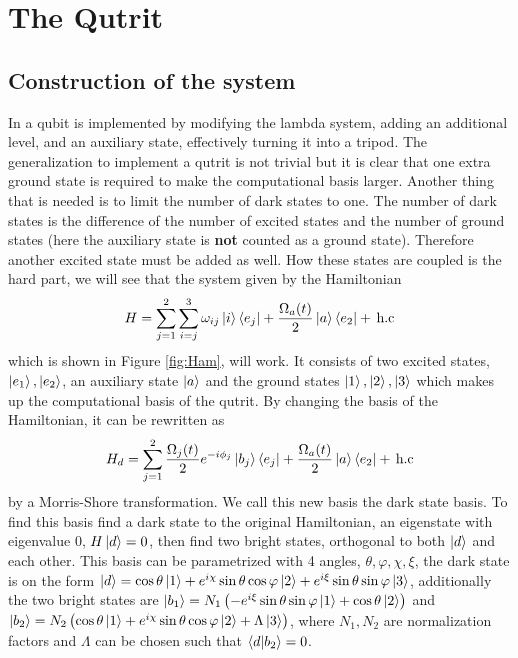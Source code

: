 \section{The Qutrit}
\subsection{Construction of the system}
In \cite{darkpath} a qubit is implemented by modifying the lambda system, adding an additional level, and an auxiliary state, effectively turning it into a tripod. 
The generalization to implement a qutrit is not trivial but it is clear that one extra ground state is required to make the computational basis larger. Another thing that is needed is to limit the number of dark states to one. The number of dark states is the difference of the number of excited states and the number of ground states\cite{lambda} (here the auxiliary state is \textbf{not} counted as a ground state). Therefore another excited state must be added as well. How these states are coupled is the hard part, we will see that the system given by the Hamiltonian
\begin{equation}
\label{eq:Ham}
H = \sum_{j = 1}^2 \sum_{i =j}^{3} \omega_{ij}\ket{i}\bra{e_j}  + \frac{\Omega_{a}(t)}{2}\ket{a}\bra{e_2}  +\,\text{h.c}
\end{equation}
which is shown in Figure \ref{fig:Ham}, will work.  It consists of two excited states, $\ket{e_1}, \ket{e_2}$, an auxiliary state $\ket{a}$ and the ground states $\ket{1}, \ket{2}, \ket{3}$ which 
makes up the computational basis of the qutrit. By changing the basis of the Hamiltonian, it can be rewritten as 
\begin{equation}
\label{eq:Hamd}
H_d = \sum_{j = 1}^2 \frac{\Omega_j(t)}{2}e^{-i\phi_j}\ket{b_j}\bra{e_j}  + \frac{\Omega_a(t)}{2}\ket{a}\bra{e_2}  +\,\text{h.c}
\end{equation} 
by a Morris-Shore transformation\cite{morris}. We call this new basis the dark state basis. To find this basis find a dark state to the original  Hamiltonian, an eigenstate with eigenvalue $0$, $H\ket{d} = 0$, then find two bright states, orthogonal to both $\ket{d}$ and each other. This basis can be parametrized with 4 angles, $\theta, \varphi, \chi, \xi$, the dark state is on the form $\ket{d} = \cos\theta\ket{1} + e^{i\chi}\sin\theta\cos\varphi\ket{2} + e^{i\xi}\sin\theta\sin\varphi\ket{3}$, additionally the two bright states are $\ket{b_1} = N_1 \left(-e^{i\xi}\sin\theta\sin\varphi\ket{1} + \cos\theta\ket{2} \right)$ and $\ket{b_2} = N_2 \left(\cos\theta\ket{1} +  e^{i\chi}\sin\theta\cos\varphi\ket{2} + \Lambda \ket{3}\right ) $, where $N_1, N_2$ are normalization factors and $\Lambda$ can be chosen such that $\bra{d}\ket{b_2} = 0$.

